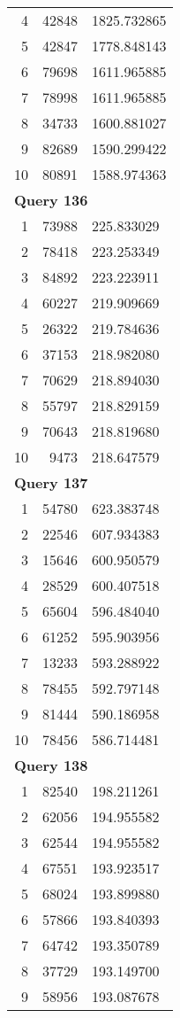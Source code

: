 \begin{longtable}[{p}]{@{}rrp{}@{}}
4 & 42848 & 1825.732865 \\
5 & 42847 & 1778.848143 \\
6 & 79698 & 1611.965885 \\
7 & 78998 & 1611.965885 \\
8 & 34733 & 1600.881027 \\
9 & 82689 & 1590.299422 \\
10 & 80891 & 1588.974363 \\
\midrule
\multicolumn{3}{l}{\bfseries Query 136} \\
1 & 73988 & 225.833029 \\
2 & 78418 & 223.253349 \\
3 & 84892 & 223.223911 \\
4 & 60227 & 219.909669 \\
5 & 26322 & 219.784636 \\
6 & 37153 & 218.982080 \\
7 & 70629 & 218.894030 \\
8 & 55797 & 218.829159 \\
9 & 70643 & 218.819680 \\
10 & 9473 & 218.647579 \\
\midrule
\multicolumn{3}{l}{\bfseries Query 137} \\
1 & 54780 & 623.383748 \\
2 & 22546 & 607.934383 \\
3 & 15646 & 600.950579 \\
4 & 28529 & 600.407518 \\
5 & 65604 & 596.484040 \\
6 & 61252 & 595.903956 \\
7 & 13233 & 593.288922 \\
8 & 78455 & 592.797148 \\
9 & 81444 & 590.186958 \\
10 & 78456 & 586.714481 \\
\midrule
\multicolumn{3}{l}{\bfseries Query 138} \\
1 & 82540 & 198.211261 \\
2 & 62056 & 194.955582 \\
3 & 62544 & 194.955582 \\
4 & 67551 & 193.923517 \\
5 & 68024 & 193.899880 \\
6 & 57866 & 193.840393 \\
7 & 64742 & 193.350789 \\
8 & 37729 & 193.149700 \\
9 & 58956 & 193.087678 \\

\end{longtable}
